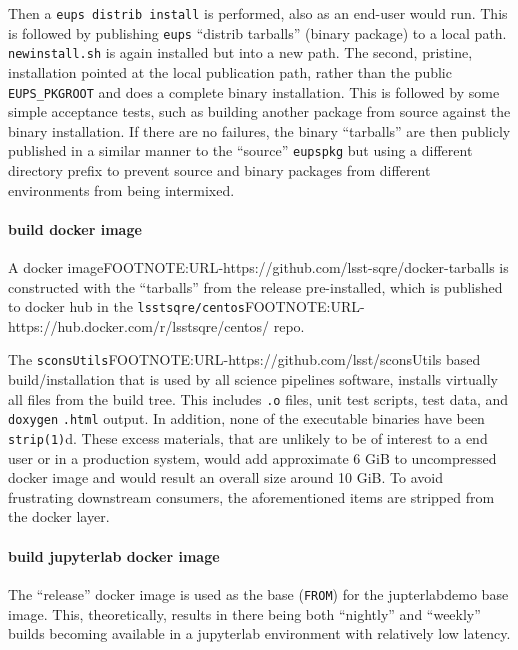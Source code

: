 Then a \texttt{eups distrib install} is performed, also as an end-user would
run.  This is followed by publishing \texttt{eups} ``distrib tarballs'' (binary
package) to a local path.  \texttt{newinstall.sh} is again installed but into a
new path.  The second, pristine, installation pointed at the local publication
path, rather than the public \texttt{EUPS\_PKGROOT} and does a complete binary
installation.  This is followed by some simple acceptance tests, such as
building another package from source against the binary installation.  If there
are no failures, the binary ``tarballs'' are then publicly published in a
similar manner to the ``source'' \texttt{eupspkg} but using a different
directory prefix to prevent source and binary packages from different
environments from being intermixed.

\paragraph{build docker image}

A docker imageFOOTNOTE:URL-https://github.com/lsst-sqre/docker-tarballs is
constructed with the ``tarballs'' from the release pre-installed, which is
published to docker hub in the
\texttt{lsstsqre/centos}FOOTNOTE:URL-https://hub.docker.com/r/lsstsqre/centos/
repo.

The \texttt{sconsUtils}FOOTNOTE:URL-https://github.com/lsst/sconsUtils based
build/installation that is used by all science pipelines software, installs
virtually all files from the build tree. This includes \texttt{.o} files, unit
test scripts, test data, and \texttt{doxygen} \texttt{.html} output. In
addition, none of the executable binaries have been \texttt{strip(1)}d.  These
excess materials, that are unlikely to be of interest to a end user or in a
production system, would add approximate 6 GiB to uncompressed docker image and
would result an overall size around 10 GiB.  To avoid frustrating downstream
consumers, the aforementioned items are stripped from the docker layer.

\paragraph{build jupyterlab docker image}

The ``release'' docker image is used as the base (\texttt{FROM}) for the
jupterlabdemo base image.  This, theoretically, results in there being both
``nightly'' and ``weekly'' builds becoming available in a jupyterlab environment
with relatively low latency.

